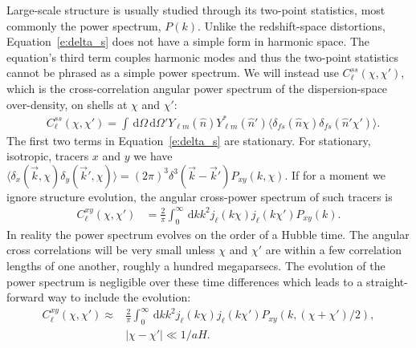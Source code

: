 \documentclass[twocolumn,prl,floatfix]{revtex4-1}
\newcommand{\ud}{\,\mathrm{d}}
\begin{document}
Large-scale structure is usually studied through its two-point statistics, most
commonly the power spectrum, $P(k)$.
Unlike the redshift-space distortions, Equation~\ref{e:delta_s} does not have a
simple form in harmonic space. The equation's third term couples harmonic modes
and thus the two-point statistics cannot be phrased as a simple power spectrum.
We will instead use $C^{ss}_\ell(\chi,\chi')$, which is
the cross-correlation angular power spectrum of the dispersion-space over-density,
on shells at $\chi$ and $\chi'$:
\begin{align}
    &C^{ss}_\ell(\chi, \chi') =
    \int\ud\Omega\ud\Omega' Y_{\ell m}(\hat n) Y^*_{\ell m}(\hat n')
    \langle \delta_{fs}(\hat n \chi) \delta_{fs}(\hat n' \chi')
        \rangle.
\end{align}
The first two terms in Equation~\ref{e:delta_s} are stationary. For stationary,
isotropic, tracers $x$ and $y$ we have 
$\langle \delta_x(\vec k, \chi) \delta_y(\vec k', \chi) \rangle = (2\pi)^3
\delta^3(\vec k - \vec k') P_{xy}(k, \chi)$.  If for a moment we ignore
structure evolution, the angular cross-power spectrum of such tracers is
\begin{align}
    C^{xy}_\ell(\chi,\chi')
    &= \frac{2}{\pi}
\int_0^\infty\ud k k^2 j_\ell(k\chi) j_{\ell}(k\chi')P_{xy}(k).
\end{align}
In reality the power spectrum evolves on the order of a Hubble time.
The angular cross correlations will be very small unless $\chi$ and $\chi'$ are
within a few correlation lengths of one another, roughly a hundred
megaparsecs.  The evolution of the power spectrum is negligible over these time
differences which leads to a straight-forward way to include the evolution:
\begin{align}
    C^{xy}_\ell(\chi,\chi') \approx&
        \frac{2}{\pi}
        \int_0^\infty\ud k k^2
        j_\ell(k\chi) j_{\ell}(k\chi')
        P_{xy}(k,(\chi + \chi')/2),\nonumber \\
    &|\chi - \chi'| \ll 1/aH.
\end{align}
\end{document}
